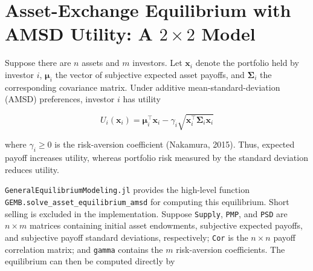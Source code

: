 \documentclass[
  letterpaper,
  DIV=11,
  numbers=noendperiod]{scrreprt}
\newenvironment{Shaded}{\begin{snugshade}}{\end{snugshade}}
\newcommand{\ConstantTok}[1]{\textcolor[rgb]{0.56,0.35,0.01}{#1}}
\newcommand{\FunctionTok}[1]{\textcolor[rgb]{0.28,0.35,0.67}{#1}}
\newcommand{\NormalTok}[1]{\textcolor[rgb]{0.00,0.23,0.31}{#1}}
\newcommand{\StringTok}[1]{\textcolor[rgb]{0.13,0.47,0.30}{#1}}
\begin{document}
%

\section{\texorpdfstring{Asset-Exchange Equilibrium with AMSD Utility: A
\(2\times2\)
Model}{Asset-Exchange Equilibrium with AMSD Utility: A 2\textbackslash times2 Model}}\label{asset-exchange-equilibrium-with-amsd-utility-a-2times2-model}

Suppose there are \(n\) assets and \(m\) investors. Let \(\mathbf x_i\)
denote the portfolio held by investor \(i\), \(\boldsymbol\mu_i\) the
vector of subjective expected asset payoffs, and \(\boldsymbol\Sigma_i\)
the corresponding covariance matrix. Under additive
mean-standard-deviation (AMSD) preferences, investor \(i\) has utility

\[
U_i(\mathbf x_i)
=
\boldsymbol\mu_i^\top\mathbf x_i
-
\gamma_i
\sqrt{\mathbf x_i^\top\boldsymbol\Sigma_i\mathbf x_i}
\]

where \(\gamma_i\geq0\) is the risk-aversion coefficient (Nakamura,
2015). Thus, expected payoff increases utility, whereas portfolio risk
measured by the standard deviation reduces utility.

\texttt{GeneralEquilibriumModeling.jl} provides the high-level function
\texttt{GEMB.solve\_asset\_equilibrium\_amsd} for computing this
equilibrium. Short selling is excluded in the implementation. Suppose
\texttt{Supply}, \texttt{PMP}, and \texttt{PSD} are \(n\times m\)
matrices containing initial asset endowments, subjective expected
payoffs, and subjective payoff standard deviations, respectively;
\texttt{Cor} is the \(n\times n\) payoff correlation matrix; and
\texttt{gamma} contains the \(m\) risk-aversion coefficients. The
equilibrium can then be computed directly by
\end{document}

